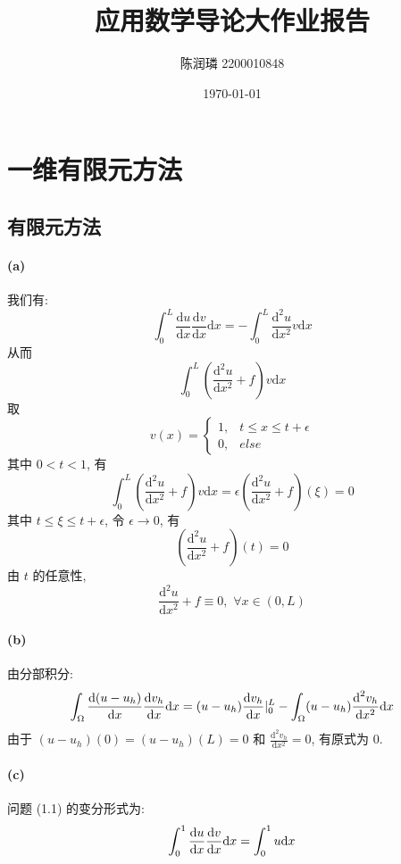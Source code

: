 \documentclass[UTF8]{article}
\title{\textbf{应用数学导论大作业报告}}
\author{陈润璘 2200010848}
\date{\today}
\begin{document}
    \maketitle


    \section{一维有限元方法}

    \subsection{有限元方法}

    \paragraph{(a)}
    我们有:
    \[
        \int_0^L \frac{\textrm{d}u}{\textrm{d}x} \frac{\textrm{d}v}{\textrm{d}x} {\textrm{d}x} =
        -\int_0^L \frac{\textrm{d}^2 u}{\textrm{d}x^2}v {\textrm{d}x}
    \]
    从而
    \[
        \int_0^L \left(\frac{\textrm{d}^2 u}{\textrm{d}x^2} + f\right)v {\textrm{d}x}
    \]
    取
    \[
        v(x)=
        \begin{cases}
            1, & t\le x\le t+\epsilon \\
            0, & else
        \end{cases}
    \]
    其中 $0<t<1$, 有
    \[
        \int_0^L \left(\frac{\textrm{d}^2 u}{\textrm{d}x^2} + f\right)v {\textrm{d}x} = \epsilon \left(\frac{\textrm{d}^2 u}{\textrm{d}x^2} + f\right)(\xi) = 0
    \]
    其中 $t\le\xi\le t + \epsilon$, 令 $\epsilon \to 0$, 有
    \[
        \left(\frac{\textrm{d}^2 u}{\textrm{d}x^2} + f\right)(t) = 0
    \]
    由 $t$ 的任意性,
    \[
        \frac{\textrm{d}^2 u}{\textrm{d}x^2} + f\equiv0,\,\,\forall x\in(0,L)
    \]

    \paragraph{(b)}
    由分部积分:
    \[
        \int_{\Omega}\frac{\textrm{d}(u-u_h)}{\textrm{d}x} \frac{\textrm{d}v_h}{\textrm{d}x}{\textrm d}x =
        (u-u_h)\frac{\textrm{d}v_h}{\textrm{d}x}|_0^L - \int_{\Omega}(u-u_h)\frac{\textrm{d}^2 v_h}{\textrm{d}x^2}{\textrm d}x
    \]
    由于 $(u-u_h)(0) = (u-u_h)(L)=0$ 和 $\frac{\textrm{d}^2 v_h}{\textrm{d}x^2}=0$, 有原式为 0.

    \paragraph{(c)}
    问题 (1.1) 的变分形式为:
    \[
        \int_0^1\frac{\textrm{d}u}{\textrm{d}x} \frac{\textrm{d}v}{\textrm{d}x}{\textrm d}x = \int_0^1 u\textrm{d}x
    \]
\end{document}
